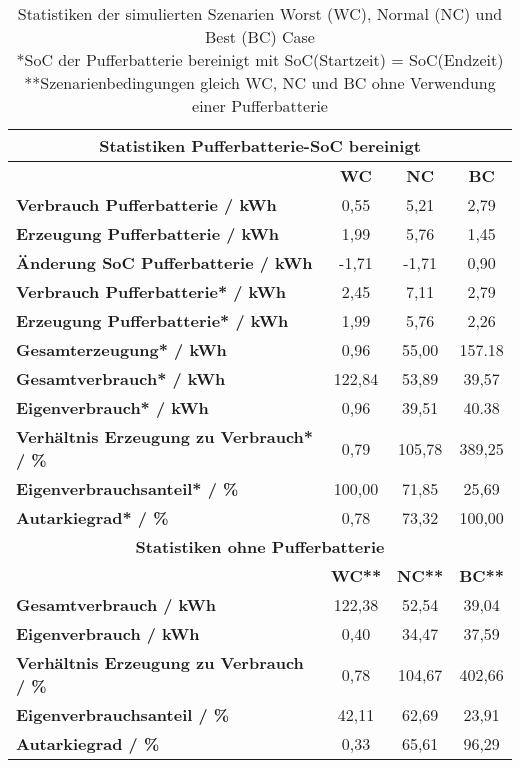         \begin{table}[h]
			\begin{tabularx}{\linewidth}{|X|c|c|c|}
				\hline 
                \multicolumn{4}{|c|}{\textbf{Statistiken Pufferbatterie-SoC bereinigt} } \\
                \hline 
														& \textbf{WC}  & \textbf{NC} & \textbf{BC}  \\ 
				\hline 
				\textbf{Verbrauch Pufferbatterie / kWh}				& 0,55		& 5,21		& 2,79 \\ 
				\hline 
				\textbf{Erzeugung Pufferbatterie / kWh} 			& 1,99		& 5,76		& 1,45 \\ 
				\hline 
				\textbf{Änderung SoC Pufferbatterie / kWh}			& -1,71		& -1,71		& 0,90 \\ 
				\hline 
				\textbf{Verbrauch Pufferbatterie* / kWh}			& 2,45		& 7,11		& 2,79 \\ 
				\hline 
				\textbf{Erzeugung Pufferbatterie* / kWh} 			& 1,99		& 5,76		& 2,26 \\ 
				\hline 
				\textbf{Gesamterzeugung* / kWh} 					& 0,96		& 55,00		& 157.18 \\ 
				\hline 
				\textbf{Gesamtverbrauch* / kWh}						& 122,84	& 53,89		& 39,57 \\ 
				\hline 
				\textbf{Eigenverbrauch* / kWh} 						& 0,96		& 39,51		& 40.38 \\ 
				\hline 
				\textbf{Verhältnis Erzeugung zu Verbrauch* / \%} 	& 0,79		& 105,78	& 389,25 \\ 
				\hline  
				\textbf{Eigenverbrauchsanteil* / \%}				& 100,00	& 71,85		& 25,69 \\ 
				\hline                
				\textbf{Autarkiegrad* / \%} 						& 0,78		& 73,32		& 100,00 \\ 
				\hline 
                \multicolumn{4}{|c|}{\textbf{Statistiken ohne Pufferbatterie} } \\
                \hline 
                										& \textbf{WC**}  & \textbf{NC**} & \textbf{BC**}  \\ 
				\hline 
				\textbf{Gesamtverbrauch / kWh}						& 122,38	& 52,54		& 39,04 \\ 
				\hline 
				\textbf{Eigenverbrauch / kWh} 						& 0,40		& 34,47		& 37,59 \\ 
				\hline 
				\textbf{Verhältnis Erzeugung zu Verbrauch / \%} 	& 0,78		& 104,67	& 402,66 \\ 
				\hline  
				\textbf{Eigenverbrauchsanteil / \%}					& 42,11		& 62,69		& 23,91 \\ 
				\hline                
				\textbf{Autarkiegrad / \%} 							& 0,33		& 65,61		& 96,29 \\ 
				\hline                
			\end{tabularx} 
			\caption{Statistiken der simulierten Szenarien Worst (WC), Normal (NC) und Best (BC) Case \\
            		*SoC der Pufferbatterie bereinigt mit SoC(Startzeit) = SoC(Endzeit) \\
                    **Szenarienbedingungen gleich WC, NC und BC ohne Verwendung einer Pufferbatterie}
			\label{Tab:Sim_stats} 
		\end{table}	



